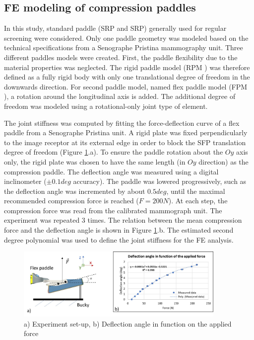 \subsection{FE modeling of compression paddles}
In this study, standard paddle (SRP and SRP) generally used for regular screening were considered. Only one paddle geometry was modeled based on the technical specifications from a Senographe Pristina mammography unit. Three different paddles models were created. First, the paddle flexibility due to the material properties was neglected. The rigid paddle model (RPM ) was therefore defined as a fully rigid body with only one translational degree of freedom in the downwards direction. For second paddle model, named flex paddle model (FPM ), a rotation around the longitudinal axis is added. The additional degree of freedom was modeled using a rotational-only joint type of element.

The joint stiffness was computed by fitting the force-deflection curve of a flex paddle from a Senographe Pristina unit. A rigid plate was fixed perpendicularly to the image receptor at its external edge in order to block the SFP translation degree of freedom (Figure \ref{fig:deflectionangle}.a). To ensure the paddle rotation about the $Oy$ axis only, the rigid plate was chosen to have the same length (in $Oy$ direction) as the compression paddle. The deflection angle was measured using a digital inclinometer ($\pm0.1deg$ accuracy). The paddle was lowered progressively, such as the deflection angle was incremented by about $0.5 deg$, until the maximal recommended compression force is reached ($F=200N$). At each step, the compression force was read from the calibrated mammograph unit. The experiment was repeated 3 times. The relation between the mean compression force and the deflection angle is shown in Figure \ref{fig:deflectionangle}.b. The estimated second degree polynomial was used to define the joint stiffness for the FE analysis.

\begin{figure}[!h]
\centering
\includegraphics[width=0.9\textwidth,keepaspectratio]{figures/deflectionAngle.jpg} 
\caption{ a) Experiment set-up, b) Deflection angle in function on the applied force }\label{fig:deflectionangle}
\end{figure}

